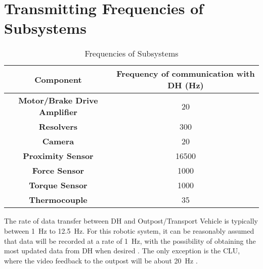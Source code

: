 \section{Transmitting Frequencies of Subsystems}
\label{app:frequencies}
\begin{table}[H]
\caption{Frequencies of Subsystems}
\centering
\begin{tabular}{cc}
\toprule
\textbf{Component}	&	\textbf{Frequency of communication with DH (\si{\hertz})}	\\
\midrule
\textbf{Motor/Brake Drive Amplifier}	&	20 \cite{ERA_jointctrl}			\\
\textbf{Resolvers}						&	300 \cite{ERA_jointctrl}		\\
\textbf{Camera}							&	20 \cite{MSSS_cameras}			\\
\textbf{Proximity Sensor}				&	16500 \cite{highres_proxsensor}	\\
\textbf{Force Sensor}					&	1000 \cite{ATI_forcesensor}		\\
\textbf{Torque Sensor}					&	1000\cite{Honeywell_torquesensor}\\
\textbf{Thermocouple}					&	35 \cite{temp_sensors}			\\
\bottomrule
\end{tabular}
\end{table}
The rate of data transfer between DH and Outpost/Transport Vehicle is typically between \SI{1}{\hertz} to \SI{12.5}{\hertz}. For this robotic system, it can be reasonably assumed that data will be recorded at a rate of \SI{1}{\hertz}, with the possibility of obtaining the most updated data from DH when desired \cite{ERA_collisionprevent}\cite{Space_teleop_robot}. The only exception is the \gls{CLU}, where the video feedback to the outpost will be about \SI{20}{\hertz} \cite{MSSS_cameras}.
